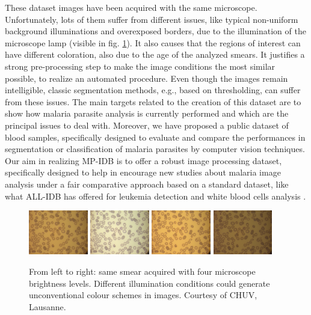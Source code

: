 \documentclass[final,a4paper,12pt,english]{UnicaPhdThesis3}
\begin{document}
{These dataset images have been acquired with the same microscope. Unfortunately, lots of them suffer from different issues, like typical non-uniform background illuminations and overexposed borders, due to the illumination of the microscope lamp (visible in fig. \ref{f1_img_types}). It also causes that the regions of interest can have different coloration, also due to the age of the analyzed smears. It justifies a strong pre-processing step to make the image conditions the most similar possible, to realize an automated procedure. Even though the images remain intelligible, classic segmentation methods, e.g., based on thresholding, can suffer from these issues.
The main targets related to the creation of this dataset are to show how malaria parasite analysis is currently performed and which are the principal issues to deal with. Moreover, we have proposed a public dataset of blood samples, specifically designed to evaluate and compare the performances in segmentation or classification of malaria parasites by computer vision techniques. Our aim in realizing MP-IDB is to offer a robust image processing dataset, specifically designed to help in encourage new studies about malaria image analysis under a fair comparative approach based on a standard dataset, like what ALL-IDB \cite{Donida} has offered for leukemia detection and white blood cells analysis \cite{DiRuberto2016}. 

\begin{figure}[h]
	\centering
	\includegraphics[width=0.23\textwidth]{images/malaria/f1a}
	\includegraphics[width=0.23\textwidth]{images/malaria/f1b}
	\includegraphics[width=0.23\textwidth]{images/malaria/f1c}
	\includegraphics[width=0.23\textwidth]{images/malaria/f1d}
	\caption{\label{f1_img_types} From left to right: same smear acquired with four microscope brightness levels. Different illumination conditions could generate unconventional colour schemes in images. Courtesy of CHUV, Lausanne.}
\end{figure}

}
\end{document}
